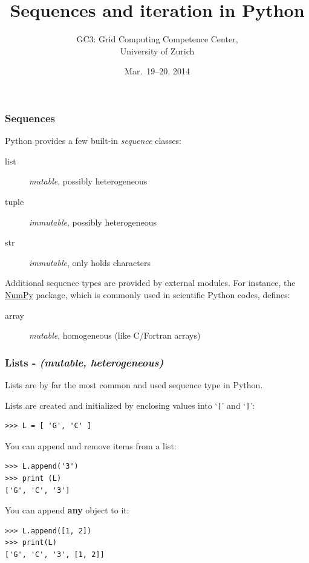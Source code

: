 \documentclass[english,serif,mathserif,xcolor=pdftex,dvipsnames,table]{beamer}
\title[Sequences, Iteration]{%
  Sequences and iteration in Python
}
\author[GC3]{%
  GC3: Grid Computing Competence Center, \\
  University of Zurich
}
\date{Mar.~19--20, 2014}
\begin{document}
\maketitle


\begin{frame}
  \frametitle{Sequences}

  Python provides a few built-in \emph{sequence} classes:
  \begin{description}
  \item[list] \emph{mutable}, possibly heterogeneous
  \item[tuple] \emph{immutable}, possibly heterogeneous
  \item[str] \emph{immutable}, only holds characters
  \end{description}
  Additional sequence types are provided by external modules. For
  instance,  the
  \href{http://numpy.scipy.org}{NumPy} package, which is commonly used in
  scientific Python codes, defines:
  \begin{description}
  \item[array] \emph{mutable}, homogeneous (like C/Fortran arrays)
  \end{description}

\end{frame}




\begin{frame}[fragile]
  \frametitle{Lists - \textit{(mutable, heterogeneous)}}
  Lists are by far the most common and used sequence type in Python.

  \+
  Lists are created and initialized by enclosing values into
  `\texttt{[}' and `\texttt{]}':
\begin{lstlisting}
>>> L = [ 'G', 'C' ]
\end{lstlisting}

  \+\pause
  You can append and remove items from a list:
\begin{lstlisting}
>>> L.append('3')
>>> print (L)
['G', 'C', '3']
\end{lstlisting}

  \+\pause
  You can append \textbf{any} object to it:
\begin{lstlisting}
>>> L.append([1, 2])
>>> print(L)
['G', 'C', '3', [1, 2]]
\end{lstlisting}

\end{frame}
\end{document}
